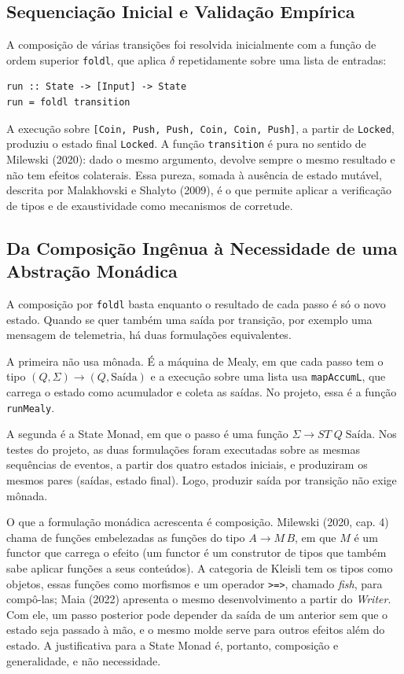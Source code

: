 \documentclass[12pt,a4paper]{article}
\begin{document}
\subsection{Sequenciação Inicial e Validação Empírica}

A composição de várias transições foi resolvida inicialmente com a função de ordem superior \texttt{foldl}, que aplica $\delta$ repetidamente sobre uma lista de entradas:

\begin{verbatim}
run :: State -> [Input] -> State
run = foldl transition
\end{verbatim}

A execução sobre \texttt{[Coin, Push, Push, Coin, Coin, Push]}, a partir de \texttt{Locked}, produziu o estado final \texttt{Locked}. A função \texttt{transition} é pura no sentido de Milewski (2020): dado o mesmo argumento, devolve sempre o mesmo resultado e não tem efeitos colaterais. Essa pureza, somada à ausência de estado mutável, descrita por Malakhovski e Shalyto (2009), é o que permite aplicar a verificação de tipos e de exaustividade como mecanismos de corretude.

\subsection{Da Composição Ingênua à Necessidade de uma Abstração Monádica}

A composição por \texttt{foldl} basta enquanto o resultado de cada passo é só o novo estado. Quando se quer também uma saída por transição, por exemplo uma mensagem de telemetria, há duas formulações equivalentes.

A primeira não usa mônada. É a máquina de Mealy, em que cada passo tem o tipo $(Q, \Sigma) \to (Q, \text{Saída})$ e a execução sobre uma lista usa \texttt{mapAccumL}, que carrega o estado como acumulador e coleta as saídas. No projeto, essa é a função \texttt{runMealy}.

A segunda é a State Monad, em que o passo é uma função $\Sigma \to ST\;Q\;\text{Saída}$. Nos testes do projeto, as duas formulações foram executadas sobre as mesmas sequências de eventos, a partir dos quatro estados iniciais, e produziram os mesmos pares (saídas, estado final). Logo, produzir saída por transição não exige mônada.

O que a formulação monádica acrescenta é composição. Milewski (2020, cap. 4) chama de funções embelezadas as funções do tipo $A \to M\,B$, em que $M$ é um functor que carrega o efeito (um functor é um construtor de tipos que também sabe aplicar funções a seus conteúdos). A categoria de Kleisli tem os tipos como objetos, essas funções como morfismos e um operador \texttt{>=>}, chamado \textit{fish}, para compô-las; Maia (2022) apresenta o mesmo desenvolvimento a partir do \textit{Writer}. Com ele, um passo posterior pode depender da saída de um anterior sem que o estado seja passado à mão, e o mesmo molde serve para outros efeitos além do estado. A justificativa para a State Monad é, portanto, composição e generalidade, e não necessidade.
\end{document}
